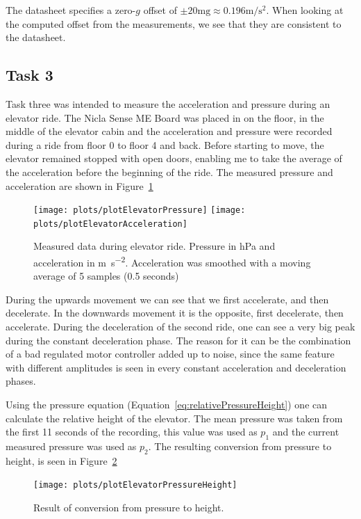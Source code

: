 \documentclass[DIV=14]{scrartcl}
\begin{document}
    The datasheet specifies a zero-$g$ offset of $\pm20 \mathrm{mg} \approx 0.196\si{\meter\per\second\squared}$.
    When looking at the computed offset from the measurements, we see that they are consistent to the datasheet.

    \subsection*{Task 3}
    Task three was intended to measure the acceleration and pressure during an elevator ride.
    The Nicla Sense ME Board was placed in on the floor, in the middle of the elevator cabin
    and the acceleration and pressure were recorded during a ride from floor 0 to floor 4 and back.
    Before starting to move, the elevator remained stopped with open doors, enabling me to take the
    average of the acceleration before the beginning of the ride.
    The measured pressure and acceleration are shown in Figure~\ref{fig:plotElevatorRaw}

    \begin{figure}[h]
        \centering
        \texttt{[image: plots/plotElevatorPressure]}\hfill
        \texttt{[image: plots/plotElevatorAcceleration]}\hfill
        \caption{Measured data during elevator ride. Pressure in \si{\hecto\pascal} and acceleration in
        \si{\meter\per\second\squared}. Acceleration was smoothed with a moving average of 5 samples (0.5 seconds)}
        \label{fig:plotElevatorRaw}
    \end{figure}

    During the upwards movement we can see that we first accelerate, and then decelerate.
    In the downwards movement it is the opposite, first decelerate, then accelerate.
    During the deceleration of the second ride, one can see a very big peak during the constant deceleration phase.
    The reason for it can be the combination of a bad regulated motor controller added up to noise,
    since the same feature with different amplitudes is seen in every constant acceleration and deceleration phases.

    Using the pressure equation (Equation~\ref{eq:relativePressureHeight}) one can calculate the relative height of the
    elevator.
    The mean pressure was taken from the first 11 seconds of the recording, this value was used as $p_1$ and the current
    measured pressure was used as $p_2$.
    The resulting conversion from pressure to height, is seen in Figure~\ref{fig:plotElevatorPressureHeight}

    \begin{figure}[!h]
        \centering
        \texttt{[image: plots/plotElevatorPressureHeight]}
        \caption{Result of conversion from pressure to height.}
        \label{fig:plotElevatorPressureHeight}
    \end{figure}
\end{document}
